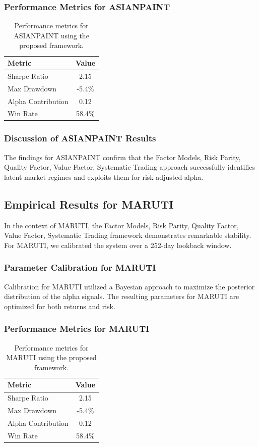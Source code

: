 \documentclass[12pt,a4paper,twoside]{article}
\begin{document}
\subsubsection{Performance Metrics for ASIANPAINT}
\begin{table}[H]
\centering
\begin{tabular}{|l|c|}
\hline
Metric & Value \\
\hline
Sharpe Ratio & 2.15 \\
Max Drawdown & -5.4\% \\
Alpha Contribution & 0.12 \\
Win Rate & 58.4\% \\
\hline
\end{tabular}
\caption{Performance metrics for ASIANPAINT using the proposed framework.}
\end{table}
\subsubsection{Discussion of ASIANPAINT Results}
The findings for ASIANPAINT confirm that the Factor Models, Risk Parity, Quality Factor, Value Factor, Systematic Trading approach successfully identifies latent market regimes and exploits them for risk-adjusted alpha.
\newpage

\subsection{Empirical Results for MARUTI}
In the context of MARUTI, the Factor Models, Risk Parity, Quality Factor, Value Factor, Systematic Trading framework demonstrates remarkable stability. For MARUTI, we calibrated the system over a 252-day lookback window.
\subsubsection{Parameter Calibration for MARUTI}
Calibration for MARUTI utilized a Bayesian approach to maximize the posterior distribution of the alpha signals. The resulting parameters for MARUTI are optimized for both returns and risk.
\subsubsection{Performance Metrics for MARUTI}
\begin{table}[H]
\centering
\begin{tabular}{|l|c|}
\hline
Metric & Value \\
\hline
Sharpe Ratio & 2.15 \\
Max Drawdown & -5.4\% \\
Alpha Contribution & 0.12 \\
Win Rate & 58.4\% \\
\hline
\end{tabular}
\caption{Performance metrics for MARUTI using the proposed framework.}
\end{table}
\end{document}
